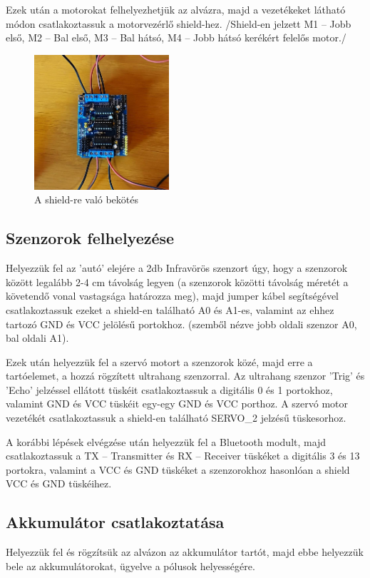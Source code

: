 \documentclass[]{thesis-ekf}
\theoremstyle{definition}
\begin{document}
Ezek után a motorokat felhelyezhetjük az alvázra, majd a vezetékeket  látható módon csatlakoztassuk a motorvezérlő shield-hez.
/Shield-en jelzett M1 – Jobb első, M2 – Bal első, M3 – Bal hátsó, M4 – Jobb hátsó kerékért felelős motor./
\begin{figure}[h]
	\centering
	\includegraphics[width=5cm]{images/robot_build/shieldre-bekotes}
	\caption{A shield-re való bekötés}
	\label{shieldre-bekotes}
\end{figure}

\subsection{Szenzorok felhelyezése}
Helyezzük fel az ’autó’ elejére a 2db Infravörös szenzort úgy, hogy a szenzorok között legalább 2-4 cm távolság legyen (a szenzorok közötti távolság méretét a követendő vonal vastagsága határozza meg), majd jumper kábel segítségével csatlakoztassuk ezeket a shield-en található A0 és A1-es, valamint az ehhez tartozó GND és VCC jelölésű portokhoz. (szemből nézve jobb oldali szenzor A0, bal oldali A1).

Ezek után helyezzük fel a szervó motort a szenzorok közé, majd erre a tartóelemet, a hozzá rögzített ultrahang szenzorral. Az ultrahang szenzor ’Trig’ és ’Echo’ jelzéssel ellátott tüskéit csatlakoztassuk a digitális 0 és 1 portokhoz, valamint GND és VCC tüskéit egy-egy GND és VCC porthoz. A szervó motor vezetékét csatlakoztassuk a shield-en található SERVO\_2 jelzésű tüskesorhoz.

A korábbi lépések elvégzése után helyezzük fel a Bluetooth modult, majd csatlakoztassuk a TX -- Transmitter és RX -- Receiver tüskéket a digitális 3 és 13 portokra, valamint a VCC és GND tüskéket a szenzorokhoz hasonlóan a shield VCC és GND tüskéihez.
\subsection{Akkumulátor csatlakoztatása}
Helyezzük fel és rögzítsük az alvázon az akkumulátor tartót, majd ebbe helyezzük bele az akkumulátorokat, ügyelve a pólusok helyességére.
\end{document}
